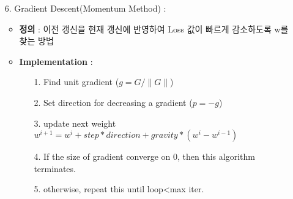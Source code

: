\documentclass{article}
\begin{document}
\begin{itemize}
\begin{itemize}
        \end{itemize}
    \item[6.] Gradient Descent(Momentum Method) :
        \begin{itemize}
            \item \textbf{정의} : 이전 갱신을 현재 갱신에 반영하여 Loss 값이 빠르게 감소하도록 w를 찾는 방법
            \item \textbf{Implementation} : 
                \begin{itemize}
                    \item[1.] Find unit gradient ($g = G/\|G\|$)
                    \item[2.] Set direction for decreasing a gradient ($p = -g$)
                    \item[3.] update next weight \newline
                            ${w}^{i+1} = {w}^{i} + step*direction + gravity*({w}^{i} - {w}^{i-1})$
                    \item[4.] If the size of gradient converge on 0, then this algorithm terminates.
                    \item[5.] otherwise, repeat this until loop<max iter.
                \end{itemize}
        \end{itemize}
    

\end{itemize}
\end{document}
